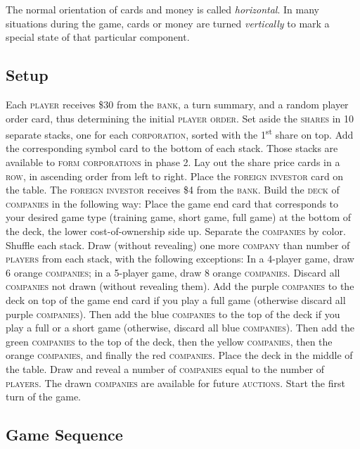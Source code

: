 \documentclass[8pt]{extarticle}
\begin{document}
\begin{small}
\begin{multicols}{2}
{The normal orientation of cards and money is called
\emph{horizontal}. In many situations during the game, cards or money
are turned \emph{vertically} to mark a special state of that
particular component.


\subsection*{Setup}

Each \textsc{player} receives \$30 from the \textsc{bank}, a turn
summary, and a random player order card, thus determining the initial
\textsc{player order}. Set aside the \textsc{shares} in 10 separate
stacks, one for each \textsc{corporation}, sorted with the
1\textsuperscript{st} share on top. Add the corresponding symbol card to
the bottom of each stack. Those stacks are available to \textsc{form
  corporations} in phase 2. Lay out the share price cards in a
\textsc{row}, in ascending order from left to right. Place the
\textsc{foreign investor} card on the table. The \textsc{foreign
  investor} receives \$4 from the \textsc{bank}. Build the
\textsc{deck} of \textsc{companies} in the following way: Place the
game end card that corresponds to your desired game type (training
game, short game, full game) at the bottom of the deck, the lower
cost-of-ownership side up. Separate the \textsc{companies} by
color. Shuffle each stack. Draw (without revealing) one more
\textsc{company} than number of \textsc{players} from each stack, with
the following exceptions: In a 4-player game, draw 6 orange
\textsc{companies}; in a 5-player game, draw 8 orange
\textsc{companies}. Discard all \textsc{companies} not drawn (without
revealing them). Add the purple \textsc{companies} to the deck on top
of the game end card if you play a full game (otherwise discard all
purple \textsc{companies}). Then add the blue \textsc{companies} to
the top of the deck if you play a full or a short game (otherwise,
discard all blue \textsc{companies}). Then add the green
\textsc{companies} to the top of the deck, then the yellow
\textsc{companies}, then the orange \textsc{companies}, and finally
the red \textsc{companies}. Place the deck in the middle of the
table. Draw and reveal a number of \textsc{companies} equal to the
number of \textsc{players}. The drawn \textsc{companies} are available
for future \textsc{auctions}. Start the first turn of the game.

\subsection*{Game Sequence}

}
\end{multicols}
\end{small}
\end{document}
